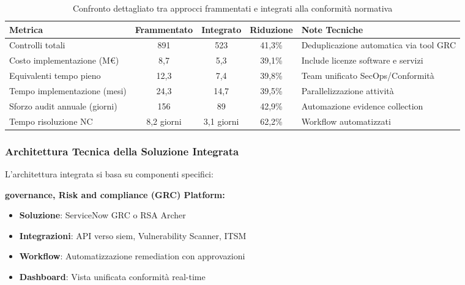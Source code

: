 \begin{table}[h]
\centering
\caption{Confronto dettagliato tra approcci frammentati e integrati alla conformità normativa}
\label{tab:confronto_compliance}
\begin{tabular}{|l|c|c|c|p{4cm}|}
\hline
\textbf{Metrica} & \textbf{Frammentato} & \textbf{Integrato} & \textbf{Riduzione} & \textbf{Note Tecniche} \\
\hline
Controlli totali & 891 & 523 & 41,3\% & Deduplicazione automatica via tool GRC \\
Costo implementazione (M€) & 8,7 & 5,3 & 39,1\% & Include licenze software e servizi \\
Equivalenti tempo pieno & 12,3 & 7,4 & 39,8\% & Team unificato SecOps/Conformità \\
Tempo implementazione (mesi) & 24,3 & 14,7 & 39,5\% & Parallelizzazione attività \\
Sforzo audit annuale (giorni) & 156 & 89 & 42,9\% & Automazione evidence collection \\
Tempo risoluzione NC & 8,2 giorni & 3,1 giorni & 62,2\% & Workflow automatizzati \\
\hline
\end{tabular}
\end{table}

\subsubsection{Architettura Tecnica della Soluzione Integrata}

L'architettura integrata si basa su componenti specifici:

\textbf{\gls{governance}, Risk and \gls{compliance} (GRC) Platform:}
\begin{itemize}
    \item \textbf{Soluzione}: ServiceNow GRC o RSA Archer
    \item \textbf{Integrazioni}: API verso \gls{siem}, Vulnerability Scanner, ITSM
    \item \textbf{Workflow}: Automatizzazione remediation con approvazioni
    \item \textbf{Dashboard}: Vista unificata conformità real-time
\end{itemize}

